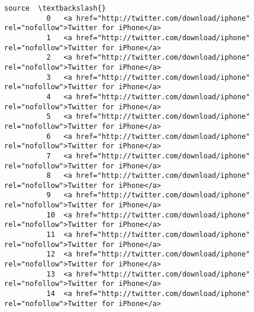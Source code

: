 \documentclass[11pt]{article}
\begin{document}
\begin{Verbatim}[commandchars=\\\{\}]
                                                                                          source  \textbackslash{}
          0   <a href="http://twitter.com/download/iphone" rel="nofollow">Twitter for iPhone</a>   
          1   <a href="http://twitter.com/download/iphone" rel="nofollow">Twitter for iPhone</a>   
          2   <a href="http://twitter.com/download/iphone" rel="nofollow">Twitter for iPhone</a>   
          3   <a href="http://twitter.com/download/iphone" rel="nofollow">Twitter for iPhone</a>   
          4   <a href="http://twitter.com/download/iphone" rel="nofollow">Twitter for iPhone</a>   
          5   <a href="http://twitter.com/download/iphone" rel="nofollow">Twitter for iPhone</a>   
          6   <a href="http://twitter.com/download/iphone" rel="nofollow">Twitter for iPhone</a>   
          7   <a href="http://twitter.com/download/iphone" rel="nofollow">Twitter for iPhone</a>   
          8   <a href="http://twitter.com/download/iphone" rel="nofollow">Twitter for iPhone</a>   
          9   <a href="http://twitter.com/download/iphone" rel="nofollow">Twitter for iPhone</a>   
          10  <a href="http://twitter.com/download/iphone" rel="nofollow">Twitter for iPhone</a>   
          11  <a href="http://twitter.com/download/iphone" rel="nofollow">Twitter for iPhone</a>   
          12  <a href="http://twitter.com/download/iphone" rel="nofollow">Twitter for iPhone</a>   
          13  <a href="http://twitter.com/download/iphone" rel="nofollow">Twitter for iPhone</a>   
          14  <a href="http://twitter.com/download/iphone" rel="nofollow">Twitter for iPhone</a>   
          

\end{Verbatim}
\end{document}
